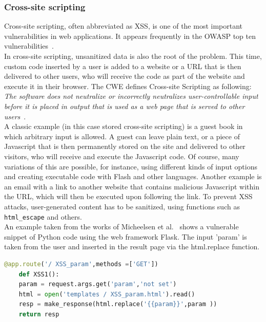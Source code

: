\documentclass[
a4paper,
pagesize,
pdftex,
12pt,
twoside, %
BCOR=5mm, %
ngerman,
fleqn,
final,
]{scrartcl}
\begin{document}
	\subsubsection{Cross-site scripting}
	Cross-site scripting, often abbreviated as XSS, is one of the most important vulnerabilities in web applications. It appears frequently in the OWASP top ten vulnerabilities~\cite{OWASPFoundation.}.\\
	In cross-site scripting, unsanitized data is also the root of the problem. This time, custom code inserted by a user is added to a website or a URL that is then delivered to other users, who will receive the code as part of the website and execute it in their browser. The CWE defines Cross-site Scripting as following: \textit{The software does not neutralize or incorrectly neutralizes user-controllable input before it is placed in output that is used as a web page that is served to other users}~\cite{CommonWeaknessEnumeration.19.09.2019}.\\
	A classic example (in this case stored cross-site scripting) is a guest book in which arbitrary input is allowed. A guest can leave plain text, or a piece of Javascript that is then permanently stored on the site and delivered to other visitors, who will receive and execute the Javascript code. Of course, many variations of this are possible, for instance, using different kinds of input options and creating executable code with Flash and other languages. Another example is an email with a link to another website that contains malicious Javascript within the URL, which will then be executed upon following the link. 
	To prevent XSS attacks, user-generated content has to be sanitized, using functions such as \texttt{html\_escape} and others.\\
	An example taken from the works of Micheelsen et al.~\cite{Micheelsen.2016} shows a vulnerable snippet of Python code using the web framework Flask. The input 'param' is taken from the user and inserted in the result page via the html.replace function.
	\begin{lstlisting}[language=Python, showstringspaces=False]
	@app.route('/ XSS_param',methods =['GET'])
	def XSS1():
	param = request.args.get('param','not set')
	html = open('templates / XSS_param.html').read()
	resp = make_response(html.replace('{{param}}',param ))
	return resp
	\end{lstlisting}
	
	
\end{document}
